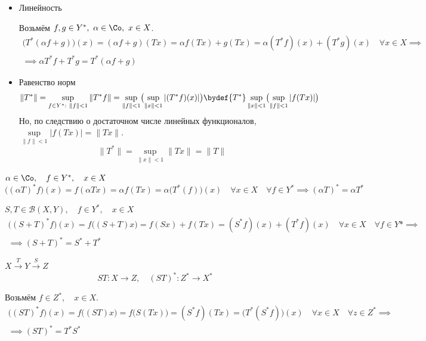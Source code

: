 \begin{eproof}
\item
	\begin{itemize}
		\item Линейность

			Возьмём $ f, g \in Y^*, ~ \alpha \in \Co, ~ x \in X $.
			\begin{multline*}
				\bigl( T^*(\alpha f + g) \bigr)(x) = (\alpha f + g)(Tx) = \alpha f(Tx) + g(Tx) =
				\alpha (T^*f)(x) + (T^* g)(x) \quad \forall x \in X \implies \\
				\implies \alpha T^* f + T^* g = T^*(\alpha f + g)
			\end{multline*}
		\item Равенство норм
			$$ \|T^*\| = \sup\limits_{f \in Y^* : ~ \|f\| < 1} \|T^*f\| =
			\sup\limits_{\|f\| < 1} \bigl( \sup\limits_{\|x\| < 1}|(T^*f)(x)| \bigr) \bydef{T^*}
			\sup\limits_{\|x\| < 1} \bigl( \sup\limits_{\|f\| < 1}|f(Tx)| \bigr) $$
			Но, по следствию о достаточном числе линейных функционалов,
			$ \sup\limits_{\|f\| < 1}|f(Tx)| = \|Tx\| $.
			$$ \|T^*\| = \sup\limits_{\|x\| < 1}\|Tx\| = \|T\| $$
	\end{itemize}
\item $ \alpha \in \Co, \quad f \in Y^*, \quad x \in X $
	$$ \bigl( (\alpha T)^* f \bigr)(x) = f(\alpha Tx) = \alpha f(Tx) =
	\alpha \bigl( T^*(f) \bigr)(x) \quad \forall x \in X \quad \forall f \in Y^* \implies
	(\alpha T)^* = \alpha T^* $$
\item $ S, T \in \mathscr B(X, Y), \quad f \in Y^*, \quad x \in X $
	\begin{multline*}
		\bigl( (S + T)^* f \bigr)(x) = f \bigl( (S + T)x \bigr) = f(Sx) + f(Tx) =
		(S^*f)(x) + (T^*f)(x) \quad \forall x \in X \quad \forall f \in Y* \implies \\
		\implies (S + T)^* = S^* + T^*
	\end{multline*}
\item $ X \xrightarrow T Y \xrightarrow S Z $
	$$ ST : X \to Z, \quad (ST)^* : Z^* \to X^* $$

	Возьмём $ f \in Z^*, \quad x \in X $.
	\begin{multline*}
		\bigl( (ST)^*f \bigr)(x) = f \bigl( (ST)x \bigr) = f \bigl( S(Tx) \bigr) = (S^*f)(Tx) =
		\bigl( T^*(S^*f) \bigr)(x) \quad \forall x \in X \quad \forall z \in Z^* \implies \\
		\implies (ST)^* = T^* S^*
	\end{multline*}
\end{eproof}

